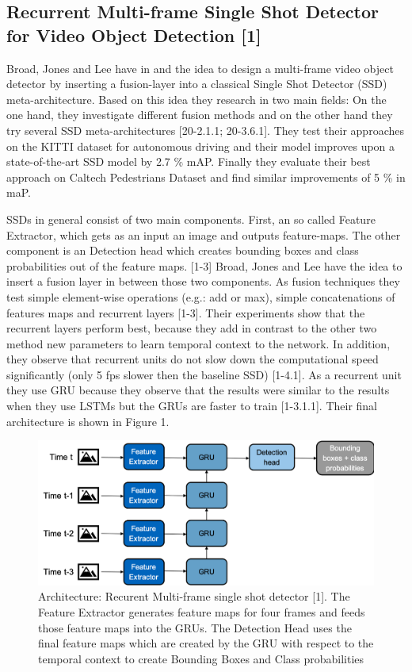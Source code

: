 \documentclass[conference]{IEEEtran}
\begin{document}
\subsection{Recurrent Multi-frame Single Shot Detector for Video Object Detection [1]}
Broad, Jones and Lee have in \cite{b1} and \cite{b12} the idea to design a multi-frame video object detector by inserting a fusion-layer into a classical Single Shot Detector (SSD) meta-architecture. Based on this idea they research in two main fields: On the one hand, they investigate different fusion methods and on the other hand they try several SSD meta-architectures [20-2.1.1; 20-3.6.1]. They test their approaches on the KITTI dataset \cite{b21} for autonomous driving and their model improves upon a state-of-the-art SSD model by 2.7 \% mAP. Finally they evaluate their best approach on Caltech Pedestrians Dataset \cite{b22} and find similar improvements of 5 \% in maP.   \newline

SSDs in general consist of two main components. First, an so called Feature Extractor, which gets as an input an image and outputs feature-maps. The other component is an Detection head which creates bounding boxes and class probabilities out of the feature maps. [1-3] Broad, Jones and Lee have the idea to insert a fusion layer in between those two components. As fusion techniques they test simple element-wise operations (e.g.: add or max), simple concatenations of features maps and recurrent layers [1-3]. Their experiments show that the recurrent layers perform best, because they add in contrast to the other two method new parameters to learn temporal context to the network. In addition, they observe that recurrent units do not slow down the computational speed significantly (only 5 fps slower then the baseline SSD) [1-4.1]. As a recurrent unit they use GRU because they observe that the results were similar to the results when they use LSTMs but the GRUs are faster to train [1-3.1.1]. Their final architecture is shown in Figure 1. 

\begin{figure} [h]
\includegraphics[width=\columnwidth]{RMFSSD}
\caption{Architecture: Recurent Multi-frame single shot detector [1]. The Feature Extractor generates feature maps for four frames and feeds those feature maps into the GRUs. The Detection Head uses the final feature maps which are created by the GRU with respect to the temporal context to create Bounding Boxes and Class probabilities}
\end{figure}
\end{document}
